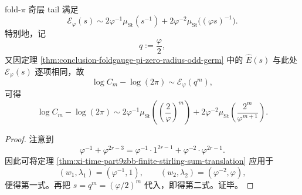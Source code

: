 \begin{corollary}\label{cor:xi-time-part9zbb-foldpi-golden-twoscale-stirling}
fold-\(\pi\) 奇层 tail 满足
\[
\mathcal E_\varphi(s)
\sim
2\varphi^{-1}\mu_{\mathrm{St}}(s^{-1})
+
2\varphi^{-2}\mu_{\mathrm{St}}\!\bigl((\varphi s)^{-1}\bigr).
\]
特别地，记
\[
q:=\frac{\varphi}{2},
\]
又因定理 \ref{thm:conclusion-foldgauge-pi-zero-radius-odd-germ} 中的
\(\widehat E(s)\) 与此处 \(\mathcal E_\varphi(s)\) 逐项相同，故
\[
\log C_m-\log(2\pi)\sim \mathcal E_\varphi(q^m),
\]
可得
\[
\log C_m-\log(2\pi)
\sim
2\varphi^{-1}\mu_{\mathrm{St}}\!\left(\left(\frac{2}{\varphi}\right)^m\right)
+
2\varphi^{-2}\mu_{\mathrm{St}}\!\left(\frac{2^m}{\varphi^{m+1}}\right).
\]
\end{corollary}
\begin{proof}
注意到
\[
\varphi^{-1}+\varphi^{2r-3}
=
\varphi^{-1}\cdot 1^{2r-1}
+
\varphi^{-2}\cdot \varphi^{2r-1}.
\]
因此可将定理 \ref{thm:xi-time-part9zbb-finite-stirling-sum-translation} 应用于
\[
(w_1,\lambda_1)=(\varphi^{-1},1),
\qquad
(w_2,\lambda_2)=(\varphi^{-2},\varphi),
\]
便得第一式。再把 \(s=q^m=(\varphi/2)^m\) 代入，即得第二式。证毕。
\end{proof}

